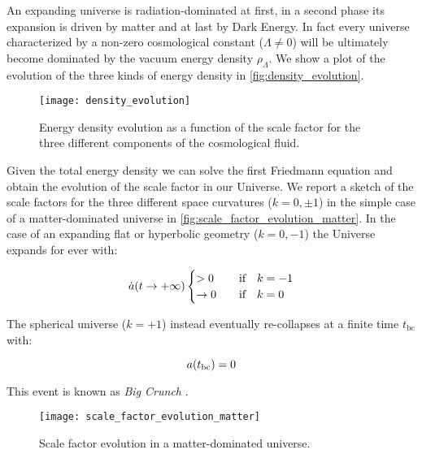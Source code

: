 An expanding universe is radiation-dominated at first, in a second phase
its expansion is driven by matter and at last by Dark Energy. In fact every
universe characterized by a non-zero cosmological constant ($\Lambda \neq
0$) will be ultimately become dominated by the vacuum energy density
$\rho_\Lambda$. We show a plot of the evolution of the three kinds of energy
density in \autoref{fig:density_evolution}.

\begin{figure}
        \centering
        \texttt{[image: density\_evolution]}
        \caption{Energy density evolution as a function of the scale factor
        for the three different components of the cosmological fluid.}
        \label{fig:density_evolution}
\end{figure}

Given the total energy density we can solve the first Friedmann equation
and obtain the evolution of the scale factor in our Universe. We report a
sketch of the scale factors for the three different space curvatures ($k =
0,\pm 1$) in the simple case of a matter-dominated universe in
\autoref{fig:scale_factor_evolution_matter}. In the case of an expanding
flat or hyperbolic geometry ($k = 0,-1$) the Universe expands for ever
with:

\begin{equation}
        \dot a\qty(t \rightarrow +\infty)
                \begin{cases}
                        > 0 & \qif k = -1 \\
                        \rightarrow 0 & \qif k = 0
                \end{cases}
\end{equation}

The spherical universe ($k = +1$) instead eventually re-collapses at a finite
time $t_{\text{bc}}$ with:

\begin{equation}
        a\qty(t_{\text{bc}}) = 0
\end{equation}

This event is known as \emph{Big Crunch} \autocite{tong2019lectures}.

\begin{figure}
        \centering
        \texttt{[image: scale\_factor\_evolution\_matter]}
        \caption{Scale factor evolution in a matter-dominated universe.}
        \label{fig:scale_factor_evolution_matter}
\end{figure}

